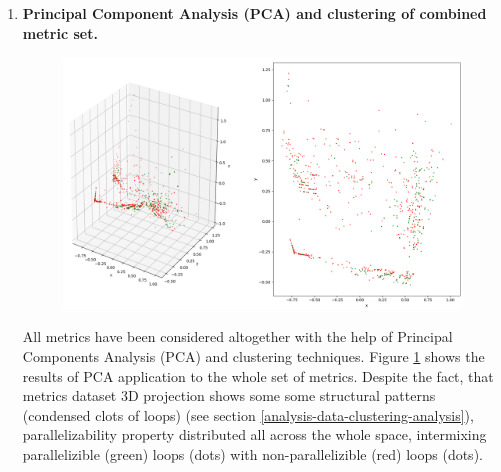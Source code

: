 \begin{enumerate}[align=left,leftmargin=*]
\begin{enumerate}
\item \textbf{Principal Component Analysis (PCA) and clustering of combined metric set.}\newline
\begin{figure}[H]
\centering
\includegraphics[width=\linewidth]{figs/metrics-pca-parallelizability.png}
\caption{}
\label{results-clustering}
\end{figure}
\null\qquad All metrics have been considered altogether with the help of Principal Components Analysis (PCA) and clustering techniques. Figure \ref{results-clustering} shows the results of PCA application to the whole set of metrics.\newline
\null\qquad Despite the fact, that metrics dataset 3D projection shows some some structural patterns (condensed clots of loops) (see section \ref{analysis-data-clustering-analysis}), parallelizability property distributed all across the whole space, intermixing parallelizible (green) loops (dots) with non-parallelizible (red) loops (dots).\newline 


\end{enumerate}
\end{enumerate}
